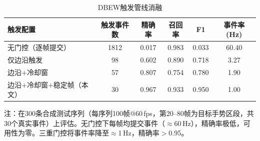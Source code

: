 \begin{table}[htbp]
  \centering
  \caption{DBEW触发管线消融}
  \label{tab:trigger_ablation}
  \small
  \begin{tabular}{lccccc}
  \hline
  触发配置 & 触发事件数 & 精确率 & 召回率 & F1 & 事件率 (Hz) \\
  \hline
  无门控（逐帧提交） & 1812 & 0.017 & 0.983 & 0.033 & 60.40 \\
  仅边沿触发 & 98 & 0.602 & 0.890 & 0.718 & 3.27 \\
  边沿$+$冷却窗 & 57 & 0.807 & 0.754 & 0.780 & 1.90 \\
  边沿$+$冷却窗$+$稳定帧（本文） & 30 & 0.967 & 0.933 & 0.950 & 1.00 \\
  \hline
  \end{tabular}
  \noindent\begin{minipage}{\linewidth}\footnotesize
  注：在300条合成测试序列（每序列100帧@60\,fps，第20--80帧为目标手势区段，共30个真实事件）上评估。无门控下每帧均提交事件（$\approx$60\,Hz），精确率极低，可用性为零。三重门控将事件率降至$\approx$1\,Hz，精确率$>$0.95。
  \end{minipage}
\end{table}
